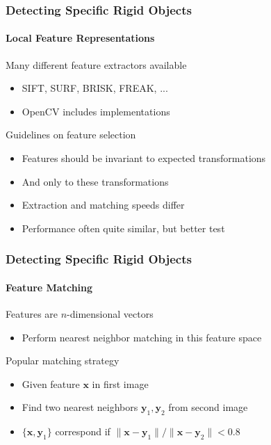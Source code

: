 \documentclass[xetex,professionalfont]{beamer}
\renewcommand{\vec}[1]{\ensuremath{\mathbf{#1}}}
\newcommand{\vx}{\vec{x}}
\newcommand{\vy}{\vec{y}}
\begin{document}
\begin{frame}
\frametitle{Detecting Specific Rigid Objects}
\framesubtitle{Local Feature Representations}

Many different feature extractors available
\begin{itemize}
    \item SIFT, SURF, BRISK, FREAK, ... %
    \item OpenCV includes implementations
\end{itemize}

\bigskip
Guidelines on feature selection
\begin{itemize}
    \item Features should be invariant to expected transformations %
    \item And only to these transformations
    \item Extraction and matching speeds differ %
    \item Performance often quite similar, but better test
\end{itemize}

\end{frame}


\begin{frame}
\frametitle{Detecting Specific Rigid Objects}
\framesubtitle{Feature Matching}

Features are $n$-dimensional vectors
\begin{itemize}
    \item Perform nearest neighbor matching in this feature space
\end{itemize}

\bigskip
Popular matching strategy
\begin{itemize}
    \item Given feature $\vx$ in first image
    \item Find two nearest neighbors $\vy_1,\vy_2$ from second image
    \item $\{\vx,\vy_1\}$ correspond if $\lVert\vx-\vy_1\rVert/\lVert\vx-\vy_2\rVert<0.8$ %
\end{itemize}

\end{frame}
\end{document}
